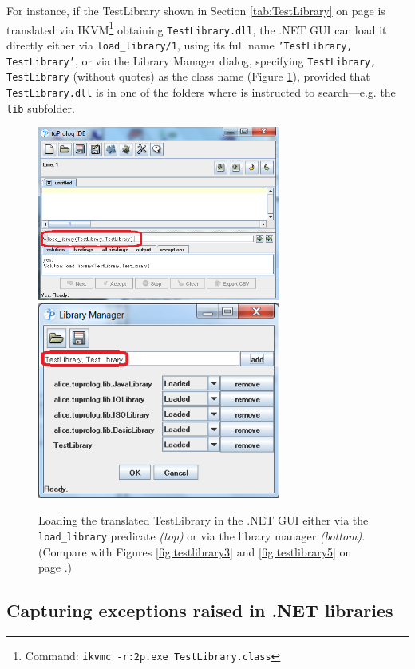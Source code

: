 For instance, if the TestLibrary shown in Section \ref{tab:TestLibrary} on page \pageref{tab:TestLibrary} is translated via IKVM\footnote{Command: \texttt{ikvmc -r:2p.exe TestLibrary.class}} obtaining \texttt{TestLibrary.dll}, the \tuprolog{}.NET GUI can load it directly either via \texttt{load\_library/1}, using its full name \texttt{'TestLibrary, TestLibrary'}, or via the Library Manager dialog, specifying \texttt{TestLibrary, TestLibrary} (without quotes) as the class name (Figure \ref{fig:dotnet-testlibrary}), provided that \texttt{TestLibrary.dll} is in one of the folders where \tuprolog{} is instructed to search---e.g. the \texttt{lib} subfolder.

\begin{figure}
    \centering
  \includegraphics[width=8cm]{images/dotnet-testlibrary1}
  \includegraphics[width=8cm]{images/dotnet-testlibrary2}
  \caption{Loading the translated TestLibrary in the \tuprolog{}.NET GUI either via the \texttt{load\_library} predicate \textit{(top)} or via the library manager \textit{(bottom)}. (Compare with Figures \ref{fig:testlibrary3} and \ref{fig:testlibrary5} on page \pageref{fig:testlibrary5}.)}\label{fig:dotnet-testlibrary}
\end{figure}

\subsection{Capturing exceptions raised in .NET libraries}

